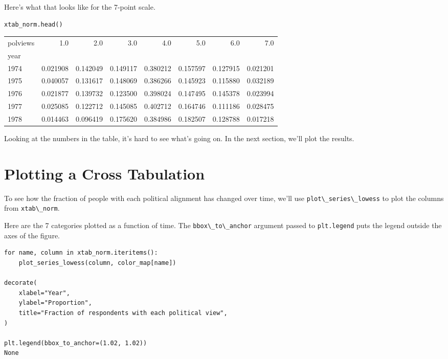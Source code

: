 Here's what that looks like for the 7-point scale.

\begin{lstlisting}[]
xtab_norm.head()
\end{lstlisting}

\begin{tabular}{lrrrrrrr}
\midrule
polviews &       1.0 &       2.0 &       3.0 &       4.0 &       5.0 &       6.0 &       7.0 \\
year &           &           &           &           &           &           &           \\
\midrule
1974 &  0.021908 &  0.142049 &  0.149117 &  0.380212 &  0.157597 &  0.127915 &  0.021201 \\
1975 &  0.040057 &  0.131617 &  0.148069 &  0.386266 &  0.145923 &  0.115880 &  0.032189 \\
1976 &  0.021877 &  0.139732 &  0.123500 &  0.398024 &  0.147495 &  0.145378 &  0.023994 \\
1977 &  0.025085 &  0.122712 &  0.145085 &  0.402712 &  0.164746 &  0.111186 &  0.028475 \\
1978 &  0.014463 &  0.096419 &  0.175620 &  0.384986 &  0.182507 &  0.128788 &  0.017218 \\
\midrule
\end{tabular}

Looking at the numbers in the table, it's hard to see what's going on.
In the next section, we'll plot the results.

\hypertarget{plotting-a-cross-tabulation}{%
\section{Plotting a Cross
Tabulation}\label{plotting-a-cross-tabulation}}

To see how the fraction of people with each political alignment has
changed over time, we'll use
\passthrough{\lstinline!plot\_series\_lowess!} to plot the columns from
\passthrough{\lstinline!xtab\_norm!}.

Here are the 7 categories plotted as a function of time. The
\passthrough{\lstinline!bbox\_to\_anchor!} argument passed to
\passthrough{\lstinline!plt.legend!} puts the legend outside the axes of
the figure.

\begin{lstlisting}[]
for name, column in xtab_norm.iteritems():
    plot_series_lowess(column, color_map[name])

decorate(
    xlabel="Year",
    ylabel="Proportion",
    title="Fraction of respondents with each political view",
)

plt.legend(bbox_to_anchor=(1.02, 1.02))
None
\end{lstlisting}

